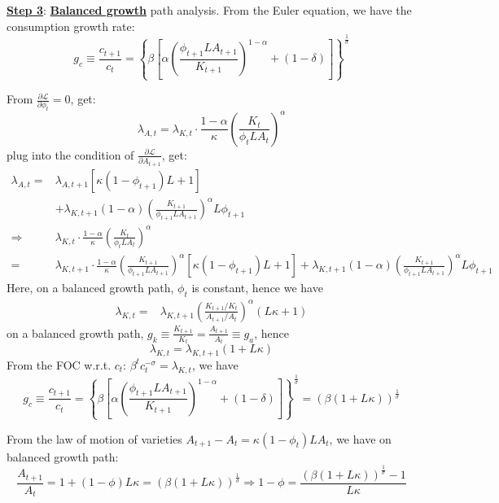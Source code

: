 \documentclass[10pt,landscape,a4paper]{article}
\begin{document}
\begin{multicols*}{3}

\vspace{2pt}
\underline{\textbf{Step 3}}: \textbf{\color{myred}\underline{Balanced growth}} path analysis.
From the Euler equation, we have the consumption growth rate:
$$
g_c \equiv \frac{c_{t+1}}{c_t}= \left\{\beta\left[\alpha\left(\frac{\phi_{t+1}LA_{t+1}}{K_{t+1}}\right)^{1-\alpha}+(1-\delta)\right]\right\}^{\frac{1}{\sigma}}
$$

From $\frac{\partial \mathcal{L}}{\partial \phi_t}=0$, get:
$$
    \lambda_{A,t}=\lambda_{K,t}\cdot \frac{1-\alpha}{\kappa}\left(\frac{K_t}{\phi_tLA_t}\right)^{\alpha}
$$
plug into the condition of $\frac{\partial \mathcal{L}}{\partial A_{t+1}}$, get:
\begin{align*}
    \lambda_{A,t}= & \lambda_{A,t+1}\left[\kappa(1-\phi_{t+1})L+1 \right]\\
    & +\lambda_{K,t+1}(1-\alpha)\left(\frac{K_{t+1}}{\phi_{t+1}L A_{t+1}}\right)^{\alpha}L\phi_{t+1}\\
    \Rightarrow & \lambda_{K,t}\cdot \frac{1-\alpha}{\kappa}\left(\frac{K_t}{\phi_tLA_t}\right)^{\alpha} \\
    =& \lambda_{K,t+1}\cdot \frac{1-\alpha}{\kappa}\left(\frac{K_{t+1}}{\phi_{t+1}LA_{t+1}}\right)^{\alpha}\left[\kappa(1-\phi_{t+1})L+1 \right]+\lambda_{K,t+1}(1-\alpha)\left(\frac{K_{t+1}}{\phi_{t+1}L A_{t+1}}\right)^{\alpha}L\phi_{t+1}
\end{align*}
Here, on a balanced growth path, $\phi_t$ is constant, hence we have
\begin{align*}
    \lambda_{K,t} =& \lambda_{K,t+1}\left(\frac{K_{t+1}/K_t}{A_{t+1}/A_t}\right)^{\alpha}(L \kappa+1)
\end{align*}
on a balanced growth path, $g_k\equiv\frac{K_{t+1}}{K_t}=\frac{A_{t+1}}{A_t}\equiv g_a$, hence
$$
\lambda_{K,t}=\lambda_{K,t+1}(1+L\kappa)
$$
From the FOC w.r.t. $c_t$: $\beta^tc_t^{-\sigma}=\lambda_{K,t}$, we have
$$
g_c \equiv \frac{c_{t+1}}{c_t}= \left\{\beta\left[\alpha\left(\frac{\phi_{t+1}LA_{t+1}}{K_{t+1}}\right)^{1-\alpha}+(1-\delta)\right]\right\}^{\frac{1}{\sigma}} = (\beta(1+L\kappa))^{\frac{1}{\sigma}}
$$

From the law of motion of varieties $A_{t+1}-A_t = \kappa(1-\phi_t)LA_t$, we have on balanced growth path:
$$
\frac{A_{t+1}}{A_t}=1+(1-\phi)L\kappa =  (\beta(1+L\kappa))^{\frac{1}{\sigma}}
\Rightarrow 1- \phi = \frac{ (\beta(1+L\kappa))^{\frac{1}{\sigma}}-1}{L\kappa}$$


\end{multicols*}
\end{document}

